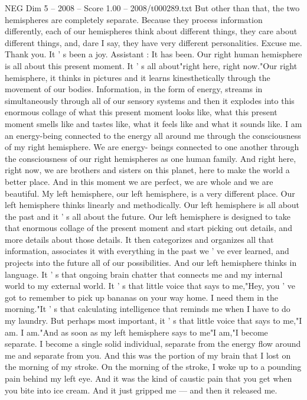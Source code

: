 \begin{textsample}{NEG Dim 5 – 2008 – Score 1.00 – 2008/t000289.txt}
But other than that, the two hemispheres are completely separate.
Because they process information differently, each of our hemispheres think about different things, they care about different things, and, dare I say, they have very different personalities.
Excuse me.
Thank you.
It ' s been a joy.
Assistant : It has been.
Our right human hemisphere is all about this present moment.
It ' s all about"right here, right now."Our right hemisphere, it thinks in pictures and it learns kinesthetically through the movement of our bodies.
Information, in the form of energy, streams in simultaneously through all of our sensory systems and then it explodes into this enormous collage of what this present moment looks like, what this present moment smells like and tastes like, what it feels like and what it sounds like.
I am an energy-being connected to the energy all around me through the consciousness of my right hemisphere.
We are energy- beings connected to one another through the consciousness of our right hemispheres as one human family.
And right here, right now, we are brothers and sisters on this planet, here to make the world a better place.
And in this moment we are perfect, we are whole and we are beautiful.
My left hemisphere, our left hemisphere, is a very different place.
Our left hemisphere thinks linearly and methodically.
Our left hemisphere is all about the past and it ' s all about the future.
Our left hemisphere is designed to take that enormous collage of the present moment and start picking out details, and more details about those details.
It then categorizes and organizes all that information, associates it with everything in the past we ' ve ever learned, and projects into the future all of our possibilities.
And our left hemisphere thinks in language.
It ' s that ongoing brain chatter that connects me and my internal world to my external world.
It ' s that little voice that says to me,"Hey, you ' ve got to remember to pick up bananas on your way home.
I need them in the morning."It ' s that calculating intelligence that reminds me when I have to do my laundry.
But perhaps most important, it ' s that little voice that says to me,"I am.
I am."And as soon as my left hemisphere says to me"I am,"I become separate.
I become a single solid individual, separate from the energy flow around me and separate from you.
And this was the portion of my brain that I lost on the morning of my stroke.
On the morning of the stroke, I woke up to a pounding pain behind my left eye.
And it was the kind of caustic pain that you get when you bite into ice cream.
And it just gripped me — and then it released me.

\end{textsample}
